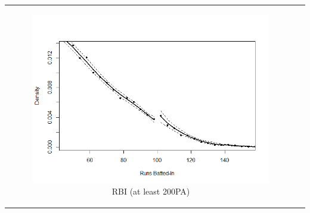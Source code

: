 \documentclass[dvipdfmx, 12pt]{article}
\begin{document}
\begin{tabular}{cc}
\begin{minipage}[H]{0.4\textwidth}
    \begin{figure}[H]
      \centering
      \includegraphics[keepaspectratio, scale = 0.5, angle = 90]
      {graphs/RBI_100.png}
      \caption{RBI (at least 200PA)}
      \label{RBI_100}
    \end{figure}
  \end{minipage}
\end{tabular}

\newpage
\end{document}

